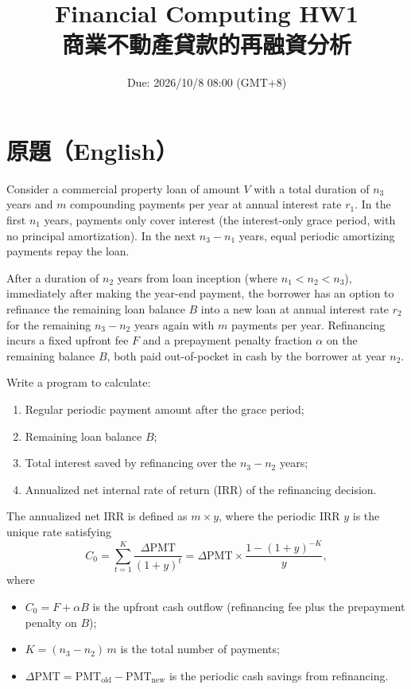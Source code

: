 \documentclass[11pt,a4paper]{article}
\title{Financial Computing HW1 \\ 商業不動產貸款的再融資分析}
\author{}
\date{Due: 2026/10/8 08:00 (GMT+8)}
\begin{document}
\maketitle

\section{原題（English）}

Consider a commercial property loan of amount $V$ with a total duration of
$n_3$ years and $m$ compounding payments per year at annual interest rate
$r_1$. In the first $n_1$ years, payments only cover interest (the
interest-only grace period, with no principal amortization). In the next
$n_3-n_1$ years, equal periodic amortizing payments repay the loan.

After a duration of $n_2$ years from loan inception (where $n_1<n_2<n_3$),
immediately after making the year-end payment, the borrower has an option to
refinance the remaining loan balance $B$ into a new loan at annual interest
rate $r_2$ for the remaining $n_3-n_2$ years again with $m$ payments per year.
Refinancing incurs a fixed upfront fee $F$ and a prepayment penalty fraction
$\alpha$ on the remaining balance $B$, both paid out-of-pocket in cash by the
borrower at year $n_2$.

Write a program to calculate:
\begin{enumerate}[nosep]
  \item Regular periodic payment amount after the grace period;
  \item Remaining loan balance $B$;
  \item Total interest saved by refinancing over the $n_3-n_2$ years;
  \item Annualized net internal rate of return (IRR) of the refinancing decision.
\end{enumerate}

The annualized net IRR is defined as $m\times y$, where the periodic IRR $y$
is the unique rate satisfying
\[
  C_0=\sum_{t=1}^{K}\frac{\Delta\mathrm{PMT}}{(1+y)^t}
     =\Delta\mathrm{PMT}\times\frac{1-(1+y)^{-K}}{y},
\]
where
\begin{itemize}[nosep]
  \item $C_0=F+\alpha B$ is the upfront cash outflow (refinancing fee plus the
        prepayment penalty on $B$);
  \item $K=(n_3-n_2)\,m$ is the total number of payments;
  \item $\Delta\mathrm{PMT}=\mathrm{PMT}_{\text{old}}-\mathrm{PMT}_{\text{new}}$
        is the periodic cash savings from refinancing.
\end{itemize}
\end{document}
